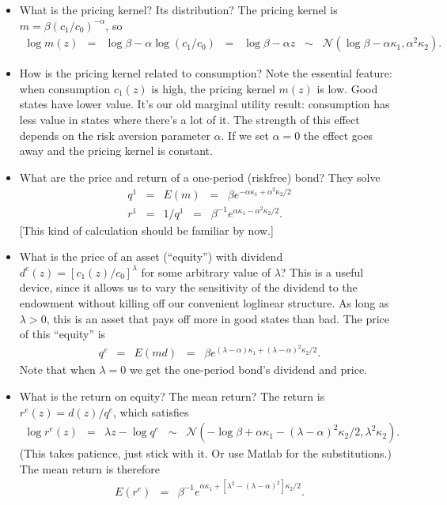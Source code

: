 \documentclass[11pt]{article}
\begin{document}
\begin{itemize}
\item What is the pricing kernel?  Its distribution?
The pricing kernel is $m = \beta (c_1/c_0)^{-\alpha}$, so
\begin{eqnarray*}
    \log m(z) &=& \log \beta - \alpha \log (c_1/c_0)
            \;\;=\;\; \log \beta - \alpha z
            \;\;\sim \;\; \mathcal{N}(\log \beta - \alpha \kappa_1, \alpha^2 \kappa_2) .
\end{eqnarray*}


\item How is the pricing kernel related to consumption?
Note the essential feature:  when consumption $c_1(z)$ is high,
the pricing kernel $m(z)$ is low.
Good states have lower value.
It's our old marginal utility result:  consumption has less value in states where there's a lot of it.
The strength of this effect depends on the risk aversion parameter $\alpha$.
If we set $\alpha = 0$ the effect goes away and the pricing kernel is constant.

\item What are the price and return of a one-period (riskfree) bond?
They solve
\begin{eqnarray*}
    q^1 &=& E(m) \;\;=\;\; \beta e^{ - \alpha \kappa_1 + \alpha^2 \kappa_2/2 } \\
    r^1 &=& 1/q^1 \;\;=\;\; \beta^{-1} e^{\alpha \kappa_1 - \alpha^2 \kappa_2/2 } .
\end{eqnarray*}
[This kind of calculation should be familiar by now.]
\item What is the price of an asset (``equity'') with dividend
$d^e(z) = [c_1(z)/c_0]^\lambda$ for some
arbitrary value of $\lambda$?
This is a useful device, since it allows us to vary the sensitivity of the dividend
to the endowment without killing off our convenient loglinear structure.
As long as $\lambda > 0$, this is an asset that pays off more in good states than bad.
The price of this ``equity'' is
\begin{eqnarray*}
    q^e &=& E(md) \;\;=\;\; \beta e^{ (\lambda- \alpha) \kappa_1
    + (\lambda-\alpha)^2 \kappa_2/2 } .
\end{eqnarray*}
Note that when $\lambda = 0$ we get the one-period bond's dividend and price.
\item What is the return on equity?  The mean return?
The return is $r^e(z) = d(z)/q^e$, which satisfies
\begin{eqnarray*}
    \log r^e(z) &=& \lambda z - \log q^e
            \;\;\sim \;\; \mathcal{N}
            (-\log \beta + \alpha \kappa_1 - (\lambda-\alpha)^2 \kappa_2/2, \lambda^2 \kappa_2) .
\end{eqnarray*}
(This takes patience, just stick with it.  Or use Matlab for the substitutions.)
The mean return is therefore
\begin{eqnarray*}
    E (r^e) &=& \beta^{-1} e^{\alpha \kappa_1 + [\lambda^2 - (\lambda-\alpha)^2] \kappa_2/2 } .
\end{eqnarray*}


\end{itemize}
\end{document}
